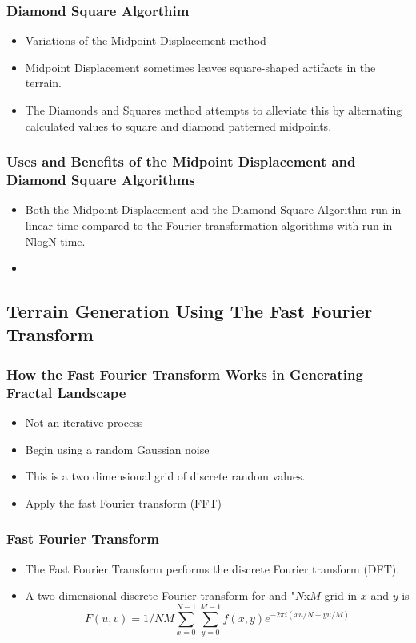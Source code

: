 \documentclass{beamer}
\begin{document}
\begin{frame}
 \frametitle{Diamond Square Algorthim}
\begin{itemize}
\item Variations of the Midpoint Displacement method
\item Midpoint Displacement sometimes leaves square-shaped artifacts in the terrain. 
\item The Diamonds and Squares method attempts to alleviate this by alternating calculated values to square and diamond patterned midpoints. 
\end{itemize}
\end{frame}

\begin{frame}
\frametitle{Uses and Benefits of the Midpoint Displacement and Diamond Square Algorithms}
\begin{itemize}
\item Both the Midpoint Displacement and the Diamond Square Algorithm run in linear time compared to the Fourier transformation algorithms with run in NlogN time.
\item
\end {itemize}
\end{frame}

\subsection{Terrain Generation Using The Fast Fourier Transform}

\begin{frame}
 \frametitle{How the Fast Fourier Transform Works in Generating Fractal Landscape}
\begin{itemize}
\item Not an iterative process
\item Begin using a random Gaussian noise
\item This is a two dimensional grid of discrete random values. 
\item Apply the fast Fourier transform (FFT)
\end{itemize}
\end{frame}

\begin{frame}
\frametitle{Fast Fourier Transform}
\begin{itemize}
\item The Fast Fourier Transform performs the discrete Fourier transform (DFT). 
\item A two dimensional discrete Fourier transform for and "$N$x$M$ grid in $x$ and $y$ is 
	$$F(u,v)=1/NM\displaystyle\sum\limits_{x=0}^{N-1} \displaystyle\sum\limits_{y=0}^{M-1} f(x,y)e^{-2\pi i(xu/N+yu/M)}$$
\end{itemize}
\end{frame}
\end{document}
